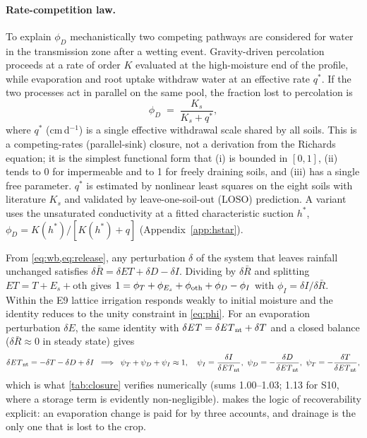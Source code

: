 \paragraph{Rate-competition law.}
\label{sec:ratelaw}
To explain $\phi_D$ mechanistically two competing pathways are considered for water in the transmission zone after a wetting event. Gravity-driven percolation proceeds at a rate of order $K$ evaluated at the high-moisture end of the profile, while evaporation and root uptake withdraw water at an effective rate $q^\ast$. If the two processes act in parallel on the same pool, the fraction lost to percolation is
\begin{equation}
\phi_D \;=\; \frac{K_s}{K_s+q^\ast},
\label{eq:rate}
\end{equation}
where $q^\ast$ (cm\,d$^{-1}$) is a single effective withdrawal scale shared by all soils. This is a competing-rates (parallel-sink) closure, not a derivation from the Richards equation; it is the simplest functional form that (i) is bounded in $[0,1]$, (ii) tends to 0 for impermeable and to 1 for freely draining soils, and (iii) has a single free parameter. $q^\ast$ is estimated by nonlinear least squares on the eight soils with literature $K_s$ and validated by leave-one-soil-out (LOSO) prediction. A variant uses the unsaturated conductivity at a fitted characteristic suction $h^\ast$,
$\phi_D=K(h^\ast)/[K(h^\ast)+q]$ (Appendix~\ref{app:hstar}).

\label{sec:theory}
From \cref{eq:wb,eq:release}, any perturbation $\delta$ of the system that leaves rainfall unchanged satisfies $\delta\bar R=\delta\mathit{ET}+\delta D-\delta I$. Dividing by $\delta\bar R$ and splitting $\mathit{ET}=T+E_s+\text{oth}$ gives $1=\phi_T+\phi_{E_s}+\phi_{\rm oth}+\phi_D-\phi_I$ with $\phi_I=\delta I/\delta\bar R$. Within the E9 lattice irrigation responds weakly to initial moisture and the identity reduces to the unity constraint in \cref{eq:phi}. For an evaporation perturbation $\delta E$, the same identity with $\delta\mathit{ET}=\delta\mathit{ET}_{\mathrm{nt}}+\delta T$ and a closed balance ($\delta\bar R\approx0$ in steady state) gives
\begin{equation}
\delta\mathit{ET}_{\mathrm{nt}} = -\delta T-\delta D+\delta I\;\;\Longrightarrow\;\;\psi_T+\psi_D+\psi_I\approx 1,\quad \psi_I=\frac{\delta I}{\delta\mathit{ET}_{\mathrm{nt}}},\ \psi_D=-\frac{\delta D}{\delta\mathit{ET}_{\mathrm{nt}}},\ \psi_T=-\frac{\delta T}{\delta\mathit{ET}_{\mathrm{nt}}},
\label{eq:psiclosure}
\end{equation}
which is what \cref{tab:closure} verifies numerically (sums 1.00--1.03; 1.13 for S10, where a storage term is evidently non-negligible).  makes the logic of recoverability explicit: an evaporation change is paid for by three accounts, and drainage is the only one that is lost to the crop.

